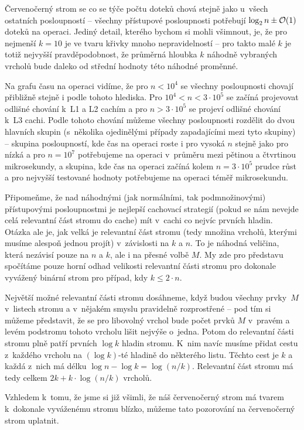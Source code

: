 Červenočerný strom se co se týče počtu doteků chová stejně jako u~všech
ostatních posloupností -- všechny přístupové posloupnosti potřebují $\log n \pm
\o(1)$ doteků na operaci. Jediný detail, kterého bychom si mohli všimnout, je,
že pro nejmenší $k=10$ je ve tvaru křivky mnoho nepravidelností -- pro takto
malé $k$ je totiž nejvyšší pravděpodobnost, že průměrná hloubka $k$ náhodně
vybraných vrcholů bude daleko od střední hodnoty této náhodné proměnné. 

Na grafu času na operaci vidíme, že pro $n<10^4$ se všechny posloupnosti
chovají přibližně stejně i podle tohoto hlediska. Pro $10^4 < n < 3\cdot
10^5$ se začíná projevovat odlišné chování k~L1 a L2 cachím a pro $n > 3\cdot
10^5$ se projeví odlišné chování k~L3 cachi. Podle tohoto chování můžeme
všechny posloupnosti rozdělit do dvou hlavních skupin (s~několika ojedinělými
případy zapadajícími mezi tyto skupiny) -- skupina posloupností, kde čas
na operaci roste i pro vysoká $n$ stejně jako pro nízká a pro $n=10^7$
potřebujeme na operaci v~průměru mezi pětinou a čtvrtinou mikrosekundy, a
skupina, kde čas na operaci začíná kolem $n=3\cdot 10^5$ prudce růst a pro
nejvyšší testované hodnoty potřebujeme na  
operaci téměř mikrosekundu.

Připomeňme, že nad náhodnými (jak normálními, tak podmnožinovými) přístupovými
posloupnostmi je nejlepší cachovací strategií (pokud se nám nevejde celá
relevantní část stromu do cache) mít v~cachi co nejvíc prvních hladin. Otázka
ale je, jak velká je relevantní část stromu (tedy množina vrcholů, kterými
musíme alespoň jednou projít) v~závislosti na $k$ a $n$. To je náhodná veličina,
která nezávisí pouze na $n$ a $k$, ale i na přesné volbě $M$. My zde pro
představu spočítáme pouze horní odhad velikosti relevantní části stromu pro
dokonale vyvážený binární strom pro případ, kdy $k\leq2\cdot n$. 

Největší možné relevantní části stromu dosáhneme, když budou všechny prvky~$M$ v~listech stromu a v~nějakém smyslu pravidelně rozprostřené -- pod tím si můžeme představit, že se pro libovolný vrchol bude počet prvků $M$ v~pravém a levém podstromu tohoto vrcholu lišit nejvýše o~jedna. Potom do relevantní části stromu plně patří prvních $\log k$ hladin stromu. K~nim navíc musíme přidat cestu z~každého vrcholu na $(\log k)$-té hladině do některého listu. Těchto cest je $k$ a každá z~nich má délku $\log n - \log k = \log (n/k)$. Relevantní část stromu  má tedy celkem $2k + k\cdot \log (n/k)$ vrcholů.

Vzhledem k~tomu, že jsme si již všimli, že náš červenočerný strom má tvarem k~dokonale vyváženému stromu blízko, můžeme tato pozorování na červenočerný strom uplatnit.

